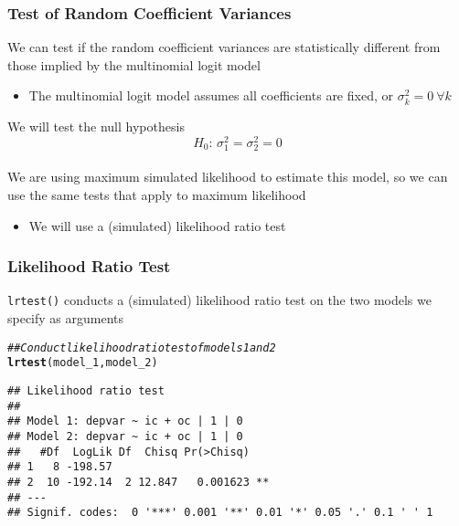 \documentclass{beamer}\usepackage[]{graphicx}\usepackage[]{color}
\makeatletter
\newcommand{\hlcom}[1]{\textcolor[rgb]{0.678,0.584,0.686}{\textit{#1}}}%
\newcommand{\hlstd}[1]{\textcolor[rgb]{0.345,0.345,0.345}{#1}}%
\newcommand{\hlkwd}[1]{\textcolor[rgb]{0.737,0.353,0.396}{\textbf{#1}}}%
\newenvironment{kframe}{%
 \def\at@end@of@kframe{}%
 \ifinner\ifhmode%
  \def\at@end@of@kframe{\end{minipage}}%
  \begin{minipage}{\columnwidth}%
 \fi\fi%
 \def\FrameCommand##1{\hskip\@totalleftmargin \hskip-\fboxsep
 \colorbox{shadecolor}{##1}\hskip-\fboxsep
     \hskip-\linewidth \hskip-\@totalleftmargin \hskip\columnwidth}%
 \MakeFramed {\advance\hsize-\width
   \@totalleftmargin\z@ \linewidth\hsize
   \@setminipage}}%
 {\par\unskip\endMakeFramed%
 \at@end@of@kframe}
\newenvironment{knitrout}{}{} %
\makeatother
\begin{document}
\begin{frame}\frametitle{Test of Random Coefficient Variances}
    We can test if the random coefficient variances are statistically different from those implied by the multinomial logit model
    \begin{itemize}
    	\item The multinomial logit model assumes all coefficients are fixed, or $\sigma_k^2 = 0 ~\forall k$
    \end{itemize}
    \vspace{3ex}
    We will test the null hypothesis
    $$H_0 \text{: } \sigma_1^2 = \sigma_2^2 = 0$$ \\
    \vspace{3ex}
    We are using maximum simulated likelihood to estimate this model, so we can use the same tests that apply to maximum likelihood
    \begin{itemize}
    	\item We will use a (simulated) likelihood ratio test
    \end{itemize}
\end{frame}

\begin{frame}[fragile]\frametitle{Likelihood Ratio Test}
    \texttt{lrtest()} conducts a (simulated) likelihood ratio test on the two models we specify as arguments \\
\begin{knitrout}\footnotesize
{}\color{fgcolor}\begin{kframe}
\begin{alltt}
\hlcom{## Conduct likelihood ratio test of models 1 and 2}
\hlkwd{lrtest}\hlstd{(model_1, model_2)}
\end{alltt}
\begin{verbatim}
## Likelihood ratio test
## 
## Model 1: depvar ~ ic + oc | 1 | 0
## Model 2: depvar ~ ic + oc | 1 | 0
##   #Df  LogLik Df  Chisq Pr(>Chisq)   
## 1   8 -198.57                        
## 2  10 -192.14  2 12.847   0.001623 **
## ---
## Signif. codes:  0 '***' 0.001 '**' 0.01 '*' 0.05 '.' 0.1 ' ' 1
\end{verbatim}
\end{kframe}
\end{knitrout}
\end{frame}
\end{document}
